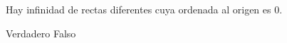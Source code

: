 Hay infinidad de rectas diferentes cuya ordenada al origen es 0.

\begin{oneparchoices}
    \CorrectChoice Verdadero
    \choice Falso
\end{oneparchoices}